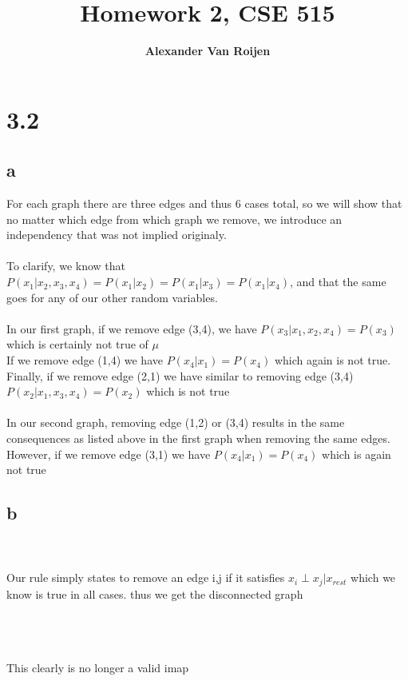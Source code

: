 \documentclass[12pt]{article}
\begin{document}
	
\title{Homework 2, CSE 515}
\author{\bf Alexander Van Roijen}

\maketitle
	
\section{3.2}
\subsection{a}
For each graph there are three edges and thus 6 cases total, so we will show that no matter which edge from which graph we remove, we introduce an independency that was not implied originaly.
\\
\\
To clarify, we know that $P(x_1|x_2,x_3,x_4) = P(x_1|x_2) = P(x_1|x_3) = P(x_1|x_4)$, and that the same goes for any of our other random variables.
\\
\\
In our first graph, if we remove edge (3,4), we have $P(x_3|x_1,x_2,x_4) = P(x_3)$ which is certainly not true of $\mu$
\\
If we remove edge (1,4) we have $P(x_4|x_1) = P(x_4)$ which again is not true.
\\
Finally, if we remove edge (2,1) we have similar to removing edge (3,4) $P(x_2|x_1,x_3,x_4) = P(x_2)$ which is not true
\\
\\
In our second graph, removing edge (1,2) or (3,4) results in the same consequences as listed above in the first graph when removing the same edges. However, if we remove edge (3,1) we have $P(x_4|x_1) = P(x_4)$ which is again not true
\subsection{b}
\\\\
Our rule simply states to remove an edge i,j if it satisfies $x_i \perp x_j | x_{rest}$ which we know is true in all cases. thus we get the disconnected graph 
\\
\\
\\
\\
This clearly is no longer a valid imap
\end{document}
